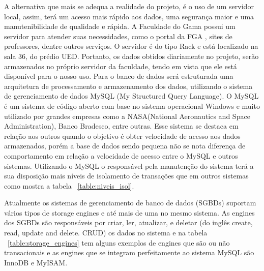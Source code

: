 A alternativa que mais se adequa a realidade do projeto, é o uso de um servidor local, assim, terá um acesso mais rápido aos dados, uma segurança maior e uma manutenibilidade de qualidade e rápida.
A Faculdade do Gama possui um servidor para atender suas necessidades, como o portal da FGA , sites de professores, dentre outros serviços. O servidor é do tipo Rack e está localizado na sala 36, do prédio UED. Portanto, os dados obtidos diariamente no projeto, serão armazenados no próprio servidor da faculdade, tendo em vista que ele está disponível para o nosso uso.
Para o banco de dados será estruturada uma arquitetura de processamento e armazenamento dos dados, utilizando o sistema de gerenciamento de dados MySQL (My Structured Query Language). O MySQL é um sistema de código aberto com base no sistema operacional Windows e muito utilizado por grandes empresas como a NASA(National Aeronautics and Space Administration), Banco Bradesco, entre outras. Esse sistema se destaca em relação aos outros quando o objetivo é obter velocidade de acesso aos dados armazenados, porém a base de dados sendo pequena não se nota diferença de comportamento em relação a velocidade de acesso entre o MySQL e outros sistemas. Utilizando o MySQL o responsável pela manutenção do sistema terá a sua disposição mais níveis de isolamento de transações que em outros sistemas como mostra a tabela ~\ref{table:niveis_isol}.

\begin{table}[]
\centering
\caption{Comparação Níveis de Isolamento.}
\label{table:niveis_isol}
\end{table}

Atualmente os sistemas de gerenciamento de banco de dados (SGBDs) suportam vários tipos de storage engines e até mais de uma no mesmo sistema. As engines dos SGBDs são responsáveis por criar, ler, atualizar,  e deletar (do inglês create, read, update and delete. CRUD) os dados no sistema e na tabela ~\ref{table:storage_engines} tem alguns exemplos de engines que são ou não transacionais e as engines que se integram perfeitamente ao sistema MySQL são InnoDB e MyISAM.

